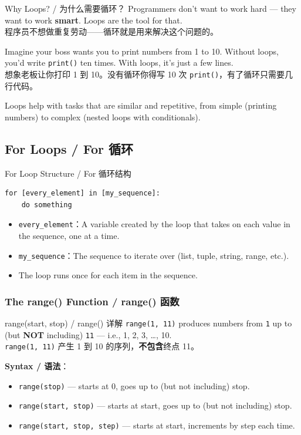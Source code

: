 \documentclass[11pt,a4paper]{article}
\begin{document}
\begin{concept}{Why Loops? / 为什么需要循环？}
    Programmers don't want to work hard — they want to work \textbf{smart}. Loops are the tool for that. \\
    程序员不想做重复劳动——循环就是用来解决这个问题的。

    Imagine your boss wants you to print numbers from 1 to 10. Without loops, you'd write \texttt{print()} ten times. With loops, it's just a few lines. \\
    想象老板让你打印 1 到 10。没有循环你得写 10 次 \texttt{print()}，有了循环只需要几行代码。

    Loops help with tasks that are similar and repetitive, from simple (printing numbers) to complex (nested loops with conditionals).
\end{concept}

\subsection{For Loops / For 循环}

\begin{concept}{For Loop Structure / For 循环结构}
    \begin{lstlisting}
for [every_element] in [my_sequence]:
    do something
    \end{lstlisting}
    \begin{itemize}[itemsep=0.3em]
        \item \texttt{every\_element}：A variable created by the loop that takes on each value in the sequence, one at a time.
        \item \texttt{my\_sequence}：The sequence to iterate over (list, tuple, string, range, etc.).
        \item The loop runs once for each item in the sequence.
    \end{itemize}
\end{concept}

\subsubsection{The range() Function / range() 函数}

\begin{concept}{range(start, stop) / range() 详解}
    \texttt{range(1, 11)} produces numbers from \texttt{1} up to (but \textbf{NOT} including) \texttt{11} — i.e., 1, 2, 3, …, 10. \\
    \texttt{range(1, 11)} 产生 1 到 10 的序列，\textbf{不包含}终点 11。

    \textbf{Syntax / 语法}：
    \begin{itemize}[itemsep=0.3em]
        \item \texttt{range(stop)} — starts at 0, goes up to (but not including) stop.
        \item \texttt{range(start, stop)} — starts at start, goes up to (but not including) stop.
        \item \texttt{range(start, stop, step)} — starts at start, increments by step each time.
    \end{itemize}
\end{concept}
\end{document}
